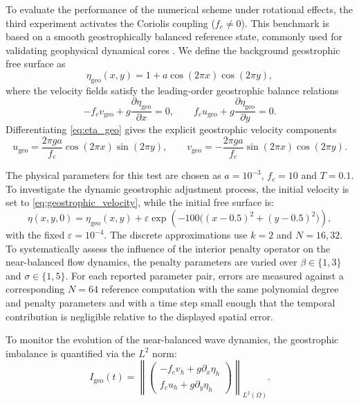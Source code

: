 \documentclass[pdflatex,sn-mathphys-num]{sn-jnl}%
\theoremstyle{thmstyleone}%
\theoremstyle{thmstyletwo}%
\theoremstyle{thmstylethree}%
\begin{document}
To evaluate the performance of the numerical scheme under rotational effects, the third experiment activates the Coriolis coupling ($f_c \ne 0$). This benchmark is based on a smooth geostrophically balanced reference state, commonly used for validating geophysical dynamical cores \cite{ambatibokhove2007,ref_article6,maddison2011}. We define the background geostrophic free surface as
\begin{equation}
\label{eq:eta_geo}
\eta_{\mathrm{geo}}(x,y)=1+a\cos(2\pi x)\cos(2\pi y),
\end{equation}
where the velocity fields satisfy the leading-order geostrophic balance relations
\begin{equation}
\label{eq:geostrophic_components}
-f_c v_{\mathrm{geo}}+g\frac{\partial \eta_{\mathrm{geo}}}{\partial x}=0,\qquad
f_c u_{\mathrm{geo}}+g\frac{\partial \eta_{\mathrm{geo}}}{\partial y}=0.
\end{equation}
Differentiating \eqref{eq:eta_geo} gives the explicit geostrophic velocity components
\begin{equation}
\label{eq:geostrophic_velocity}
u_{\mathrm{geo}}
=
\frac{2\pi g a}{f_c}\cos(2\pi x)\sin(2\pi y),
\qquad
v_{\mathrm{geo}}
=
-\frac{2\pi g a}{f_c}\sin(2\pi x)\cos(2\pi y).
\end{equation}

The physical parameters for this test are chosen as $a=10^{-3}$, $f_c=10$ and $T=0.1$. To investigate the dynamic geostrophic adjustment process, the initial velocity is set to \eqref{eq:geostrophic_velocity}, while the initial free surface is:
\begin{equation}
\label{eq:rotating_perturbation}
\eta(x,y,0)
=
\eta_{\mathrm{geo}}(x,y)
+
\varepsilon\exp\left(-100\bigl((x-0.5)^2+(y-0.5)^2\bigr)\right),
\end{equation}
with the fixed $\varepsilon=10^{-4}$. The discrete approximations use $k=2$ and $N=16,32$.
To systematically assess the influence of the interior penalty operator on the near-balanced flow dynamics,
the penalty parameters are varied over $\beta\in\{1,3\}$ and $\sigma\in\{1,5\}$. For each reported parameter pair, errors are measured against a corresponding $N=64$ reference computation with the same polynomial degree and penalty parameters and with a time step small enough that the temporal contribution is negligible relative to the displayed spatial error.

To monitor the evolution of the near-balanced wave dynamics, the geostrophic imbalance is quantified via the $L^2$ norm:
\begin{equation}
\label{eq:geo_imbalance}
I_{\mathrm{geo}}(t)
=
\left\|
\begin{pmatrix}
-f_c v_h + g\partial_x\eta_h\\
f_c u_h + g\partial_y\eta_h
\end{pmatrix}
\right\|_{L^2(\Omega)}.
\end{equation}
\end{document}
